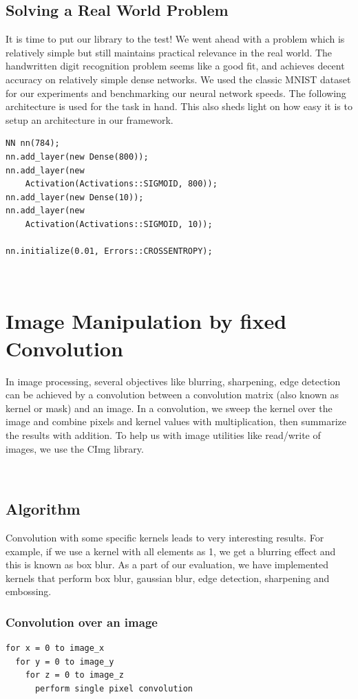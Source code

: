 \documentclass[conference]{IEEEtran}
\begin{document}
\subsection{Solving a Real World Problem}
It is time to put our library to the test! We went ahead with a problem which is relatively simple but still maintains practical relevance in the real world. The handwritten digit recognition problem seems like a good fit, and achieves decent accuracy on relatively simple dense networks.
We used the classic MNIST dataset\cite{mnist} for our experiments and benchmarking our neural network speeds. The following architecture is used for the task in hand. This also sheds light on how easy it is to setup an architecture in our framework.

\begin{lstlisting}
NN nn(784);
nn.add_layer(new Dense(800));
nn.add_layer(new 
    Activation(Activations::SIGMOID, 800));
nn.add_layer(new Dense(10));
nn.add_layer(new 
    Activation(Activations::SIGMOID, 10));

nn.initialize(0.01, Errors::CROSSENTROPY);
\end{lstlisting}

 \\

\section{Image Manipulation by fixed Convolution}
In image processing, several objectives like blurring, sharpening, edge detection can be achieved by a convolution between a convolution matrix (also known as kernel or mask) and an image. In a convolution, we sweep the kernel over the image and combine pixels and kernel values with multiplication, then summarize the results with addition.  To help us with image utilities like read/write of images, we use the CImg library\cite{CImg}.

 \\
\subsection{Algorithm}
Convolution with some specific kernels leads to very interesting results. For example, if we use a kernel with all elements as 1, we get a blurring effect and this is known as box blur. As a part of our evaluation, we have implemented kernels that perform box blur, gaussian blur, edge detection, sharpening and embossing.

\begin{frame}
\frametitle{Convolution over an image}
  \lstset{language=C++}
\begin{lstlisting}
for x = 0 to image_x 
  for y = 0 to image_y
    for z = 0 to image_z
      perform single pixel convolution
\end{lstlisting}
\end{frame}
\end{document}
